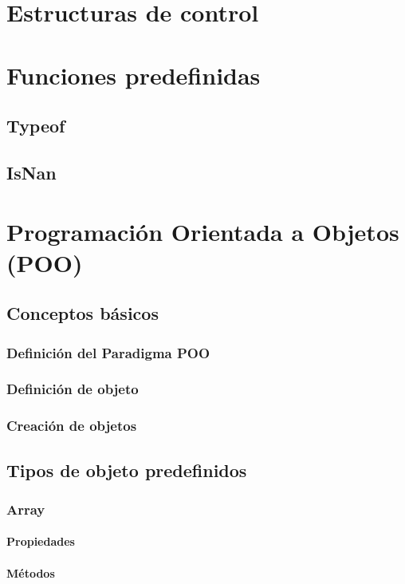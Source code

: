 \documentclass[12pt]{report}
\begin{document}
	\section{Estructuras de control}
	\section{Funciones predefinidas}
		\subsection{Typeof}
		\subsection{IsNan}
	\section{Programación Orientada a Objetos (POO)}
		\subsection{Conceptos básicos}
			\subsubsection{Definición del Paradigma POO}
			\subsubsection{Definición de objeto}
			\subsubsection{Creación de objetos}
		\subsection{Tipos de objeto predefinidos}
			\subsubsection{Array}
				\paragraph{Propiedades} %
				\paragraph{Métodos}
\end{document}
